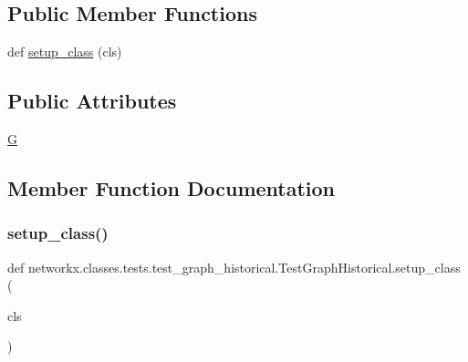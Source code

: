 \subsection*{Public Member Functions}
\begin{DoxyCompactItemize}
\item 
def \hyperlink{classnetworkx_1_1classes_1_1tests_1_1test__graph__historical_1_1TestGraphHistorical_af912c7e9d0c3f4f0ae1b04b7b58cf1d6}{setup\+\_\+class} (cls)
\end{DoxyCompactItemize}
\subsection*{Public Attributes}
\begin{DoxyCompactItemize}
\item 
\hyperlink{classnetworkx_1_1classes_1_1tests_1_1test__graph__historical_1_1TestGraphHistorical_ad310e833413e33b62815413f7b25a451}{G}
\end{DoxyCompactItemize}


\subsection{Member Function Documentation}
\mbox{\label{classnetworkx_1_1classes_1_1tests_1_1test__graph__historical_1_1TestGraphHistorical_af912c7e9d0c3f4f0ae1b04b7b58cf1d6}} 
\subsubsection{\texorpdfstring{setup\+\_\+class()}{setup\_class()}}
{\footnotesize\ttfamily def networkx.\+classes.\+tests.\+test\+\_\+graph\+\_\+historical.\+Test\+Graph\+Historical.\+setup\+\_\+class (\begin{DoxyParamCaption}\item[{}]{cls }\end{DoxyParamCaption})}



